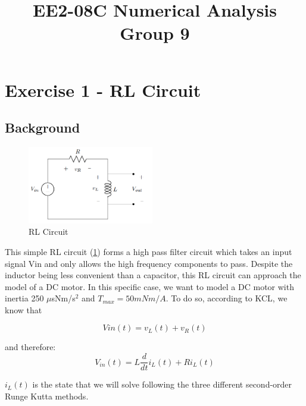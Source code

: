 \documentclass[11pt,a4paper]{article}
\date{}
\author{}
\begin{document}
\vspace{-20mm}
\title{\textbf{EE2-08C Numerical Analysis} \\ Group 9\vspace{-17mm}}
\maketitle
\tableofcontents
\pagebreak

\section{Exercise 1 - RL Circuit}\vspace{-1mm}

\subsection{Background}
\begin{figure}
\vspace{-10mm}
\includegraphics[width=0.49\textwidth]{Ex1_Figs/RL_circuit.png}
\vspace{-6mm}
\caption{RL Circuit}
\label{fig:RL1}
\end{figure}
This simple RL circuit (\ref{fig:RL1}) forms a high pass filter circuit which takes an input signal Vin and only allows the high frequency components to pass. Despite the inductor being less convenient than a capacitor, this RL circuit can approach the model of a DC motor. In this specific case, we want to model a DC motor with inertia 250 $\mu$sNm/s$^2$ and $T_{max} = 50mNm/A$. To do so, according to KCL, we know that

\begin{equation}
Vin(t) = v_L(t) + v_R(t)
\end{equation}


and therefore:
\begin{equation}
V_{in}(t) = L\frac{d}{dt}i_L(t) + R i_L(t)
\end{equation}

$i_L(t)$ is the state that we will solve following the three different second-order Runge Kutta methods.
\end{document}
